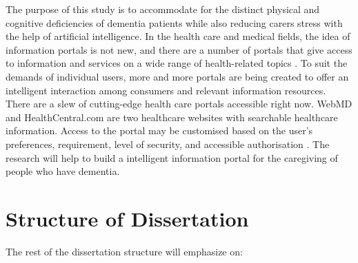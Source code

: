 The purpose of this study is to accommodate for the distinct physical and cognitive deficiencies of dementia patients while also reducing carers stress with the help of artificial intelligence. In the health care and medical fields, the idea of information portals is not new, and there are a number of portals that give access to information and services on a wide range of health-related topics \citep{am1}. To suit the demands of individual users, more and more portals are being created to offer an intelligent interaction among consumers and relevant information resources. There are a slew of cutting-edge health care portals accessible right now. WebMD and HealthCentral.com are two healthcare websites with searchable healthcare information. Access to the portal may be customised based on the user's preferences, requirement, level of security, and accessible authorisation \citep{am2}. The research will help to build a intelligent information portal for the caregiving of people who have dementia.

\goodbreak

\section{Structure of Dissertation}
The rest of the dissertation structure will emphasize on:

